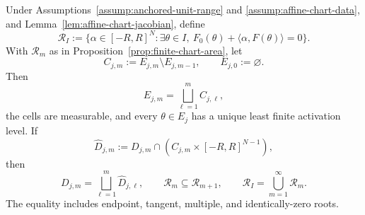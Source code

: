 \begin{lemma}
\label{lem:affine-exhaustion}
Under Assumptions~\ref{assump:anchored-unit-range} and
\ref{assump:affine-chart-data}, and
Lemma~\ref{lem:affine-chart-jacobian}, define
\[
\mathcal R_I:=\{\alpha\in[-R,R]^N:\exists\theta\in I,
 \ F_0(\theta)+\langle\alpha,F(\theta)\rangle=0\}.
\]
With $\mathcal R_m$ as in Proposition~\ref{prop:finite-chart-area}, let
\[
C_{j,m}:=E_{j,m}\setminus E_{j,m-1},
\qquad E_{j,0}:=\varnothing.
\]
Then
\[
E_{j,m}=\bigsqcup_{\ell=1}^m C_{j,\ell},
\]
the cells are measurable, and every $\theta\in E_j$ has a unique least
finite activation level.  If
\[
\widehat D_{j,m}:=D_{j,m}\cap
 (C_{j,m}\times[-R,R]^{N-1}),
\]
then
\begin{equation}
D_{j,m}=\bigsqcup_{\ell=1}^m\widehat D_{j,\ell},
\qquad
\mathcal R_m\subseteq\mathcal R_{m+1},
\qquad
\mathcal R_I=\bigcup_{m=1}^\infty\mathcal R_m.
\label{eq:appendix-37}
\end{equation}
The equality includes endpoint, tangent, multiple, and identically-zero
roots.
\end{lemma}

